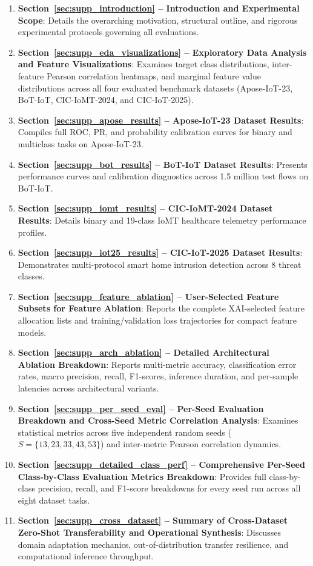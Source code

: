 \documentclass[a4paper,fleqn]{cas-sc}
\begin{document}
\begin{enumerate}
    \item \textbf{Section~\ref{sec:supp_introduction} -- Introduction and Experimental Scope}: Details the overarching motivation, structural outline, and rigorous experimental protocols governing all evaluations.
    \item \textbf{Section~\ref{sec:supp_eda_visualizations} -- Exploratory Data Analysis and Feature Visualizations}: Examines target class distributions, inter-feature Pearson correlation heatmaps, and marginal feature value distributions across all four evaluated benchmark datasets (Apose-IoT-23, BoT-IoT, CIC-IoMT-2024, and CIC-IoT-2025).
    \item \textbf{Section~\ref{sec:supp_apose_results} -- Apose-IoT-23 Dataset Results}: Compiles full ROC, PR, and probability calibration curves for binary and multiclass tasks on Apose-IoT-23.
    \item \textbf{Section~\ref{sec:supp_bot_results} -- BoT-IoT Dataset Results}: Presents performance curves and calibration diagnostics across 1.5 million test flows on BoT-IoT.
    \item \textbf{Section~\ref{sec:supp_iomt_results} -- CIC-IoMT-2024 Dataset Results}: Details binary and 19-class IoMT healthcare telemetry performance profiles.
    \item \textbf{Section~\ref{sec:supp_iot25_results} -- CIC-IoT-2025 Dataset Results}: Demonstrates multi-protocol smart home intrusion detection across 8 threat classes.
    \item \textbf{Section~\ref{sec:supp_feature_ablation} -- User-Selected Feature Subsets for Feature Ablation}: Reports the complete XAI-selected feature allocation lists and training/validation loss trajectories for compact feature models.
    \item \textbf{Section~\ref{sec:supp_arch_ablation} -- Detailed Architectural Ablation Breakdown}: Reports multi-metric accuracy, classification error rates, macro precision, recall, F1-scores, inference duration, and per-sample latencies across architectural variants.
    \item \textbf{Section~\ref{sec:supp_per_seed_eval} -- Per-Seed Evaluation Breakdown and Cross-Seed Metric Correlation Analysis}: Examines statistical metrics across five independent random seeds ($S=\{13, 23, 33, 43, 53\}$) and inter-metric Pearson correlation dynamics.
    \item \textbf{Section~\ref{sec:supp_detailed_class_perf} -- Comprehensive Per-Seed Class-by-Class Evaluation Metrics Breakdown}: Provides full class-by-class precision, recall, and F1-score breakdowns for every seed run across all eight dataset tasks.
    \item \textbf{Section~\ref{sec:supp_cross_dataset} -- Summary of Cross-Dataset Zero-Shot Transferability and Operational Synthesis}: Discusses domain adaptation mechanics, out-of-distribution transfer resilience, and computational inference throughput.
\end{enumerate}
\end{document}
